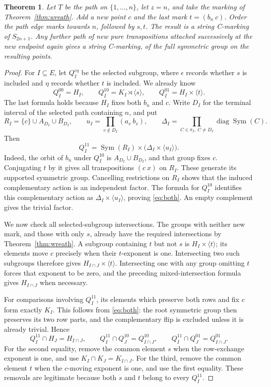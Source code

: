 \documentclass[a4paper,11pt]{article}
\newcommand{\Sym}{\operatorname{Sym}}
\newcommand{\gen}[1]{\langle #1\rangle}
\newtheorem{theorem}{Theorem}\newtheorem{lemma}[theorem]{Lemma}\newtheorem{corollary}[theorem]{Corollary}
\begin{document}
\begin{theorem}\label{thm:tail}
Let $T$ be the path on $\{1,\ldots,n\}$, let $z=n$, and take the marking
of Theorem~\ref{thm:wreath}. Add a new point $c$ and the last mark
$t=(b_n\ c)$. Order the path edge marks towards $n$, followed by $s,t$.
The result is a string C-marking of $S_{2n+1}$.
Any further path of new pure transpositions attached successively at the
new endpoint again gives a string C-marking, of the full symmetric group
on the resulting points.
\end{theorem}
\begin{proof}
For $I\subseteq E$, let $Q_I^{\epsilon\eta}$ be the selected subgroup,
where $\epsilon$ records whether $s$ is included and $\eta$ records whether
$t$ is included. We already know
\[
 Q_I^{00}=H_I,\qquad Q_I^{10}=K_I\rtimes\gen{s},\qquad
 Q_I^{01}=H_I\times\gen{t}.
\]
The last formula holds because $H_I$ fixes both $b_n$ and $c$.
Write $D_I$ for the terminal interval of the selected path containing $n$,
and put
\[
 R_I=\{c\}\cup A_{D_I}\cup B_{D_I},\qquad
 u_I=\prod_{v\notin D_I}(a_v\ b_v),\qquad
 \Delta_I=\prod_{C\in\pi_I,\ C\ne D_I}\operatorname{diag}\Sym(C).
\]
Then
\begin{equation}\label{eq:both}
 Q_I^{11}=\Sym(R_I)\times\bigl(\Delta_I\times\gen{u_I}\bigr).
\end{equation}
Indeed, the orbit of $b_n$ under $Q_I^{10}$ is $A_{D_I}\cup B_{D_I}$,
and that group fixes $c$. Conjugating $t$ by it gives all transpositions
$(c\ x)$ on $R_I$. These generate its supported symmetric group.
Cancelling restrictions on $R_I$ shows that the induced complementary action
is an independent factor. The formula for $Q_I^{10}$ identifies this
complementary action as $\Delta_I\times\gen{u_I}$, proving
\eqref{eq:both}. An empty complement gives the trivial factor.

We now check all selected-subgroup intersections. The groups with neither
new mark, and those with only $s$, already have the required intersections
by Theorem~\ref{thm:wreath}. A subgroup containing $t$ but not $s$ is
$H_I\times\gen{t}$; its elements move $c$ precisely when their $t$-exponent
is one. Intersecting two such subgroups therefore gives
$H_{I\cap J}\times\gen{t}$. Intersecting one with any group omitting $t$
forces that exponent to be zero, and the preceding mixed-intersection
formula gives $H_{I\cap J}$ when necessary.

For comparisons involving $Q_I^{11}$, its elements which preserve both rows
and fix $c$ form exactly $K_I$. This follows from \eqref{eq:both}: the root
symmetric group then preserves its two row parts, and the complementary
flip is excluded unless it is already trivial. Hence
\[
 Q_I^{11}\cap H_J=H_{I\cap J},\qquad
 Q_I^{11}\cap Q_J^{10}=Q_{I\cap J}^{10},\qquad
 Q_I^{11}\cap Q_J^{01}=Q_{I\cap J}^{01}.
\]
For the second equality, remove the common element $s$ when the row-exchange
exponent is one, and use $K_I\cap K_J=K_{I\cap J}$.
For the third, remove the common element $t$ when the $c$-moving exponent is
one, and use the first equality. These removals are legitimate because both
$s$ and $t$ belong to every $Q_I^{11}$.


\end{proof}
\end{document}
